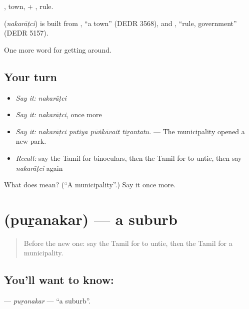 , town, + , rule.

\begin{cousinweb}
\textbf{} (\emph{nakarāṭci}) is built from , \textquotedblleft{}a town\textquotedblright{} (DEDR 3568), and , \textquotedblleft{}rule, government\textquotedblright{} (DEDR 5157).
\end{cousinweb}

\begin{grammarlens}[title={What you've built}]
One more word for getting around.
\end{grammarlens}

\subsection*{Your turn}
\begin{itemize}
\raggedright
  \item \emph{Say it:} \emph{nakarāṭci}
  \item \emph{Say it:} \emph{nakarāṭci}, once more
  \item \emph{Say it:} \emph{nakarāṭci putiya pūṅkāvait tiṟantatu.} — The municipality opened a new park.
  \item \emph{Recall:} say the Tamil for binoculars, then the Tamil for to untie, then say \emph{nakarāṭci} again
\end{itemize}

\begin{tcolorbox}[breakable,colback=teal!4,colframe=teal!35!black,title={Before you move on}]
What does  mean? (\textquotedblleft{}A municipality\textquotedblright{}.) Say it once more.
\end{tcolorbox}
\section[\texorpdfstring{\ta{புறநகர்} (puṟanakar)}{புறநகர் (puṟanakar)}]{ (puṟanakar) — a suburb}

\label{lesson:TA-C423-puranakar}



\begin{quote}
Before the new one: say the Tamil for to untie, then the Tamil for a municipality.
\end{quote}

\subsection*{You'll want to know: }
\textbf{} — \emph{puṟanakar} — \textquotedblleft{}a suburb\textquotedblright{}.


